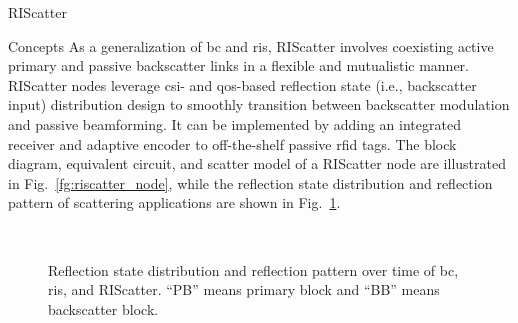 \documentclass[journal]{IEEEtran}
\begin{document}
\begin{section}{RIScatter}
	\begin{subsection}{Concepts}
		As a generalization of \gls{bc} and \gls{ris}, RIScatter involves coexisting active primary and passive backscatter links in a flexible and mutualistic manner.
		RIScatter nodes leverage \gls{csi}- and \gls{qos}-based reflection state (i.e., backscatter input) distribution design to smoothly transition between backscatter modulation and passive beamforming.
		It can be implemented by adding an integrated receiver \cite{Kim2021a} and adaptive encoder \cite{He2020e} to off-the-shelf passive \gls{rfid} tags.
		The block diagram, equivalent circuit, and scatter model of a RIScatter node are illustrated in Fig.~\ref{fg:riscatter_node}, while the reflection state distribution and reflection pattern of scattering applications are shown in Fig.~\ref{fg:scatter_comparison}.
		\begin{figure*}[!t]
			\centering
			\caption{
			Block diagram, equivalent circuit, and scatter model of a RIScatter node.
			The solid and dashed vectors represent signal and energy flows.
			The scatter antenna behaves as a constant power source, where the voltage $V_0$ and current $I_0$ are introduced by incident electric field $\vec{E}_{\text{I}}$ and magnetic field $\vec{H}_{\text{I}}$ \cite{Huang2021}.
			}
			\label{fg:riscatter_node}
		\end{figure*}
		\begin{figure}[!t]
			\centering
			\\
			\caption{
				Reflection state distribution and reflection pattern over time of \gls{bc}, \gls{ris}, and RIScatter.
				``PB'' means primary block and ``BB'' means backscatter block.
			}
			\label{fg:scatter_comparison}

\end{figure}
\end{subsection}
\end{section}
\end{document}
